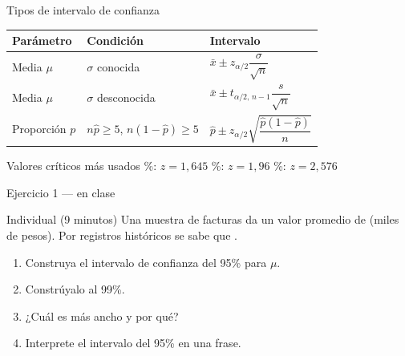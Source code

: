 \documentclass[aspectratio=169,10pt]{beamer}
\begin{document}
\begin{frame}{Tipos de intervalo de confianza}
  \footnotesize
  \begin{center}
  \begin{tabular}{@{}lll@{}}
    \toprule
    \textbf{Parámetro} & \textbf{Condición} & \textbf{Intervalo} \\
    \midrule
    Media $\mu$ & $\sigma$ conocida &
      $\bar{x}\pm z_{\alpha/2}\dfrac{\sigma}{\sqrt{n}}$ \\[0.5em]
    Media $\mu$ & $\sigma$ desconocida &
      $\bar{x}\pm t_{\alpha/2,\,n-1}\dfrac{s}{\sqrt{n}}$ \\[0.5em]
    Proporción $p$ & $n\hat p\ge 5$, $n(1-\hat p)\ge 5$ &
      $\hat{p}\pm z_{\alpha/2}\sqrt{\dfrac{\hat p(1-\hat p)}{n}}$ \\
    \bottomrule
  \end{tabular}
  \end{center}

  \vspace{0.2cm}
  \begin{exampleblock}{Valores críticos más usados}
    \footnotesize
    \%: $z=1{,}645$ \%: $z=1{,}96$ \%: $z=2{,}576$
  \end{exampleblock}
\end{frame}

\begin{frame}{Ejercicio 1 — en clase}
  \begin{alertblock}{Individual (9 minutos)}
    Una muestra de  facturas da un valor promedio de
     (miles de pesos). Por registros históricos se sabe
    que .

    \vspace{0.25cm}
    \begin{enumerate}
      \item Construya el intervalo de confianza del 95\% para $\mu$.
      \item Constrúyalo al 99\%.
      \item ¿Cuál es más ancho y por qué?
      \item Interprete el intervalo del 95\% en una frase.
    \end{enumerate}
  \end{alertblock}
\end{frame}
\end{document}

